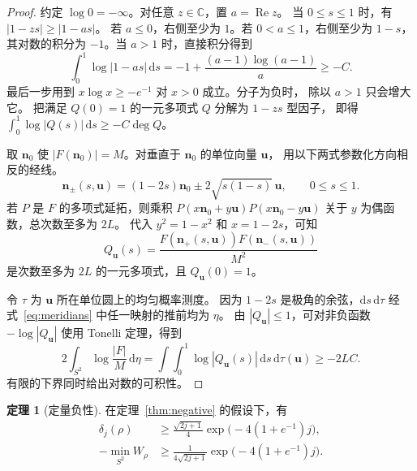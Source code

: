 \documentclass[UTF8,11pt,a4paper]{ctexart}
\theoremstyle{definition}
\newtheorem{theorem}{定理}
\newcommand{\dd}{\,\mathrm{d}}
\newcommand{\vn}{\mathbf n}
\newcommand{\vu}{\mathbf u}
\begin{document}
\begin{proof}
约定 \(\log 0=-\infty\)。对任意 \(z\in\mathbb C\)，置 \(a=\operatorname{Re}z\)。
当 \(0\leq s\leq1\) 时，有 \(|1-zs|\geq|1-as|\)。
若 \(a\leq0\)，右侧至少为 \(1\)。若 \(0<a\leq1\)，右侧至少为 \(1-s\)，
其对数的积分为 \(-1\)。当 \(a>1\) 时，直接积分得到
\begin{equation}
  \int_0^1\log|1-as|\dd s
  =-1+\frac{(a-1)\log(a-1)}{a}\geq -C .
  \label{eq:linear-log}
\end{equation}
最后一步用到 \(x\log x\geq-e^{-1}\) 对 \(x>0\) 成立。分子为负时，
除以 \(a>1\) 只会增大它。
把满足 \(Q(0)=1\) 的一元多项式 \(Q\) 分解为 \(1-zs\) 型因子，
即得 \(\int_0^1\log|Q(s)|\dd s\geq-C\deg Q\)。

取 \(\vn_0\) 使 \(|F(\vn_0)|=M\)。对垂直于 \(\vn_0\) 的单位向量 \(\vu\)，
用以下两式参数化方向相反的经线。
\begin{equation}
  \vn_\pm(s,\vu)=(1-2s)\vn_0
                    \pm 2\sqrt{s(1-s)}\,\vu,\qquad 0\leq s\leq1 .
  \label{eq:meridians}
\end{equation}
若 \(P\) 是 \(F\) 的多项式延拓，则乘积
\(P(x\vn_0+y\vu)P(x\vn_0-y\vu)\) 关于 \(y\) 为偶函数，总次数至多为 \(2L\)。
代入 \(y^2=1-x^2\) 和 \(x=1-2s\)，可知
\[
  Q_{\vu}(s)=\frac{F(\vn_+(s,\vu))F(\vn_-(s,\vu))}{M^2}
\]
是次数至多为 \(2L\) 的一元多项式，且 \(Q_\vu(0)=1\)。

令 \(\tau\) 为 \(\vu\) 所在单位圆上的均匀概率测度。
因为 \(1-2s\) 是极角的余弦，\(\mathrm ds\,\mathrm d\tau\) 经
式~\eqref{eq:meridians} 中任一映射的推前均为 \(\eta\)。
由 \(|Q_\vu|\leq1\)，可对非负函数 \(-\log|Q_\vu|\) 使用 Tonelli 定理，得到
\[
  2\int_{S^2}\log\frac{|F|}{M}\dd\eta
  =\int\!\int_0^1\log|Q_{\vu}(s)|\dd s\dd\tau(\vu)
  \geq -2LC .
\]
有限的下界同时给出对数的可积性。
\end{proof}

\begin{theorem}[定量负性]\label{thm:bounds}
在定理~\ref{thm:negative} 的假设下，有
\begin{align}
  \delta_j(\rho)
  &\geq \frac{\sqrt{2j+1}}{4}\exp\bigl(-4(1+e^{-1})j\bigr),
    \label{eq:volume-bound}\\
  -\min_{S^2}W_\rho
  &\geq \frac{1}{4\sqrt{2j+1}}\exp\bigl(-4(1+e^{-1})j\bigr).
    \label{eq:depth-bound}
\end{align}
\end{theorem}
\end{document}
